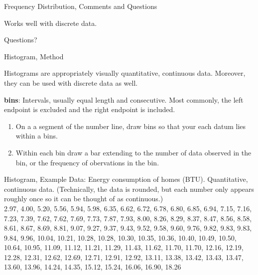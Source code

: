 \documentclass{beamer}
\newcommand{\qtns}[0]{\begin{center} Questions? \end{center}}
\newcommand{\nl}[1]{\vspace{#1 em}}
\begin{document}
\begin{center}
    \begin{frame}{Frequency Distribution, Comments and Questions}
        \begin{center}
            Works well with discrete data.
        \end{center}
        \qtns
    \end{frame}
\end{center}

\begin{frame}{Histogram, Method}
    \begin{center}
        Histograms are appropriately visually quantitative, continuous data. Moreover, they can be used with discrete data as well.
    \end{center}
    {\bf bins}: Intervals, usually equal length and consecutive. Most commonly, the left endpoint is excluded and the right endpoint is included.
    \begin{enumerate}
        \item On a a segment of the number line, draw bins so that your each datum lies within a bins.
        \item Within each bin draw a bar extending to the number of data observed in the bin, or the frequency of obervations in the bin.
    \end{enumerate}
\end{frame}

\begin{frame}{Histogram, Example}
    Data: Energy consumption of homes (BTU). Quantitative, continuous data. (Technically, the data is rounded, but each number only appears roughly once so it can be thought of as continuous.)\\
    \nl{0.5}
    2.97,
    4.00,
    5.20,
    5.56,
    5.94,
    5.98,
    6.35,
    6.62,
    6.72,
    6.78,
    6.80,
    6.85,
    6.94,
    7.15,
    7.16,
    7.23,
    7.39,
    7.62,
    7.62,
    7.69,
    7.73,
    7.87,
    7.93,
    8.00,
    8.26,
    8.29,
    8.37,
    8.47,
    8.56,
    8.58,
    8.61,
    8.67,
    8.69,
    8.81,
    9.07,
    9.27,
    9.37,
    9.43,
    9.52,
    9.58,
    9.60,
    9.76,
    9.82,
    9.83,
    9.83,
    9.84,
    9.96,
    10.04,
    10.21,
    10.28,
    10.28,
    10.30,
    10.35,
    10.36,
    10.40,
    10.49,
    10.50,
    10.64,
    10.95,
    11.09,
    11.12,
    11.21,
    11.29,
    11.43,
    11.62,
    11.70,
    11.70,
    12.16,
    12.19,
    12.28,
    12.31,
    12.62,
    12.69,
    12.71,
    12.91,
    12.92,
    13.11,
    13.38,
    13.42,
    13.43,
    13.47,
    13.60,
    13.96,
    14.24,
    14.35,
    15.12,
    15.24,
    16.06,
    16.90,
    18.26
\end{frame}
\end{document}
